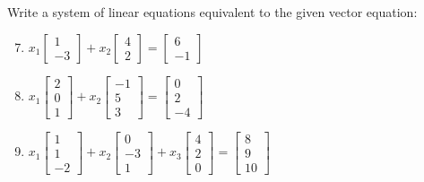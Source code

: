 \documentclass[12pt]{article}
\begin{document}
Write a system of linear equations equivalent to the given vector equation:
\begin{enumerate}
\setcounter{enumi}{6}
    \item $x_1 \begin{bmatrix} 1 \\ -3 \end{bmatrix} + x_2 \begin{bmatrix} 4 \\ 2 \end{bmatrix} = \begin{bmatrix} 6 \\ -1 \end{bmatrix}$
    \item $x_1 \begin{bmatrix} 2 \\ 0 \\ 1 \end{bmatrix} + x_2 \begin{bmatrix} -1 \\ 5 \\ 3 \end{bmatrix} = \begin{bmatrix} 0 \\ 2 \\ -4 \end{bmatrix}$
    \item $x_1 \begin{bmatrix} 1 \\ 1 \\ -2 \end{bmatrix} + x_2 \begin{bmatrix} 0 \\ -3 \\ 1 \end{bmatrix} + x_3 \begin{bmatrix} 4 \\ 2 \\ 0 \end{bmatrix} = \begin{bmatrix} 8 \\ 9 \\ 10 \end{bmatrix}$
\end{enumerate}
\end{document}
